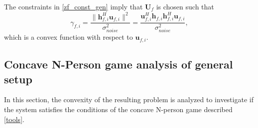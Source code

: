 The constraints in \eqref{zf_const_gen} imply that $\mathbf{U}_{f}$ is chosen such that  
	\begin{equation}\label{zf_snr}
	\gamma_{f,i} = \frac{\|\mathbf{h}^H_{f,i}\mathbf{u}_{f,i}\|^2}
	{\sigma^2_{noise}  
	}
	= 
	\frac{\mathbf{u}^H_{f,i}\mathbf{h}_{f,i}\mathbf{h}^H_{f,i}\mathbf{u}_{f,i}}
	{\sigma^2_{noise}  
	},
	\end{equation}
	which is a convex function with respect to $\mathbf{u}_{f,i}$.
	
\subsection{Concave N-Person game analysis of general setup}
In this section, the convexity of the resulting problem is analyzed to investigate if the system satisfies the conditions of the concave N-person game described \ref{tools}. 

